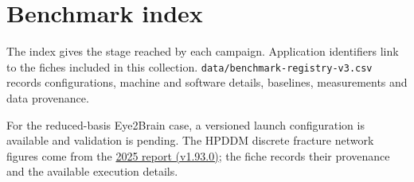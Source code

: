 \section{Benchmark index}
\label{sec:benchmark-index}

The index gives the stage reached by each campaign. Application
identifiers link to the fiches included in this collection.
\nolinkurl{data/benchmark-registry-v3.csv} records configurations, machine
and software details, baselines, measurements and data provenance.

For the reduced-basis Eye2Brain case, a versioned launch configuration is
available and validation is pending. The HPDDM discrete fracture network
figures come from the
\href{https://github.com/numpex/exa-ma-d7.1/blob/4473ef61ceec1773e7593385c92a87959438d92c/chapters/applications/specs/app-hpddm-dfn.tex}{2025 report (v1.93.0)};
the fiche records their provenance and the available execution details.

